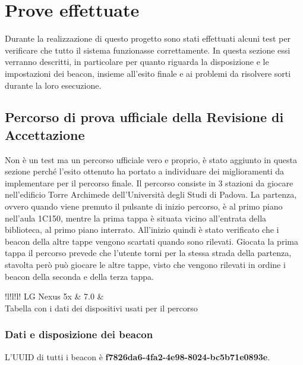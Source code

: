\section{Prove effettuate}
\label{prove}
Durante la realizzazione di questo progetto sono stati effettuati alcuni test per verificare che tutto il sistema funzionasse correttamente. In questa sezione essi verranno descritti, in particolare per quanto riguarda la disposizione e le impostazioni dei beacon, insieme all'esito finale e ai problemi da risolvere sorti durante la loro esecuzione.
	\subsection{Percorso di prova ufficiale della Revisione di Accettazione}
		Non è un test ma un percorso ufficiale vero e proprio, è stato aggiunto in questa sezione perché l'esito ottenuto ha portato a individuare dei miglioramenti da implementare per il percorso finale.
		Il percorso consiste in 3 stazioni da giocare nell'edificio Torre Archimede dell'Università degli Studi di Padova. La partenza, ovvero quando viene premuto il pulsante di inizio percorso, è al primo piano nell'aula 1C150, mentre la prima tappa è situata vicino all'entrata della biblioteca, al primo piano interrato. All'inizio quindi è stato verificato che i beacon della altre tappe vengono scartati quando sono rilevati. Giocata la prima tappa il percorso prevede che l'utente torni per la stessa strada della partenza, stavolta però può giocare le altre tappe, visto che vengono rilevati in ordine i beacon della seconda e della terza tappa.

		\begin{tabella}{!{\VRule}l!{\VRule}l!{\VRule}l!{\VRule}} %
			LG Nexus 5x & 7.0 & \\
			\caption{Tabella con i dati dei dispositivi usati per il percorso}
		\end{tabella}

		\subsubsection{Dati e disposizione dei beacon}
		L'UUID di tutti i beacon è \textbf{f7826da6-4fa2-4e98-8024-bc5b71e0893e}.

